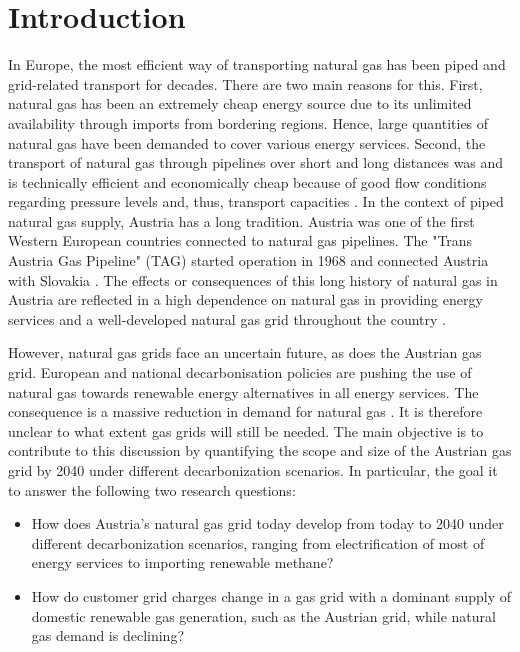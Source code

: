 \section{Introduction}

In Europe, the most efficient way of transporting natural gas has been piped and grid-related transport for decades. There are two main reasons for this. First, natural gas has been an extremely cheap energy source due to its unlimited availability through imports from bordering regions. Hence, large quantities of natural gas have been demanded to cover various energy services. Second, the transport of natural gas through pipelines over short and long distances was and is technically efficient and economically cheap because of good flow conditions regarding pressure levels and, thus, transport capacities \cite{thomas2003review}. In the context of piped natural gas supply, Austria has a long tradition. Austria was one of the first Western European countries connected to natural gas pipelines. The "Trans Austria Gas Pipeline" (TAG) started operation in 1968 and connected Austria with Slovakia \cite{gas_connect_austria}. The effects or consequences of this long history of natural gas in Austria are reflected in a high dependence on natural gas in providing energy services \cite{eurostat_natural_gas} and a well-developed natural gas grid throughout the country \cite{econtrol_grid}.\vspace{0.3cm}

However, natural gas grids face an uncertain future, as does the Austrian gas grid. European and national decarbonisation policies are pushing the use of natural gas towards renewable energy alternatives in all energy services. The consequence is a massive reduction in demand for natural gas \cite{repowereu}. It is therefore unclear to what extent gas grids will still be needed. The main objective is to contribute to this discussion by quantifying the scope and size of the Austrian gas grid by 2040 under different decarbonization scenarios. In particular, the goal it to answer the following two research questions:

\begin{itemize}
	\item How does Austria's natural gas grid today develop from today to 2040 under different decarbonization scenarios, ranging from electrification of most of energy services to importing renewable methane?
	\item How do customer grid charges change in a gas grid with a dominant supply of domestic renewable gas generation, such as the Austrian grid, while natural gas demand is declining?
\end{itemize}

